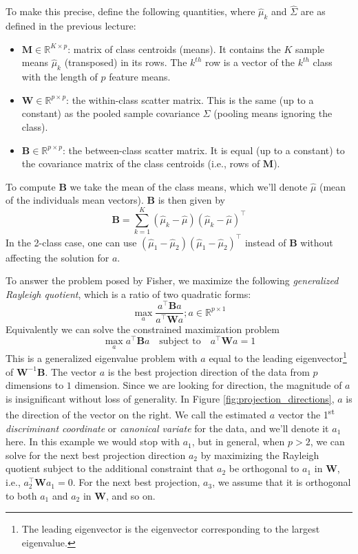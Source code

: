 \documentclass[a4paper]{article}
\begin{document}
To make this precise, define the following quantities, where ${\hat \mu}_k$ and ${\hat \Sigma}$ are as defined in the previous lecture:
\begin{itemize}
\item ${\mathbf M}\in {\mathbb R}^{K\times p}$: matrix of class centroids (means).  It contains the $K$ sample means $\hat{\mu}_{k}$ (transposed) in its rows. The $k^{th}$ row is a vector of the $k^{th}$ class with the length of $p$ feature means. 
\item ${\mathbf W}\in {\mathbb R}^{p\times p}$: the within-class scatter matrix.  This is the same (up to a constant) as the pooled sample covariance $\hat{\Sigma}$ (pooling means ignoring the class).
\item ${\mathbf B}\in {\mathbb R}^{p\times p}$: the between-class scatter matrix.  It is equal (up to a constant) to the covariance matrix of the class centroids (i.e., rows of $\mathbf M$).
\end{itemize}
To compute $\mathbf B$ we take the mean of the class means, which we'll denote $\hat{\mu}$ (mean of the individuals mean vectors).  $\mathbf B$ is then given by
$$
{\mathbf B} = \sum_{k=1}^K (\hat{\mu}_k-\hat{\mu})(\hat{\mu}_k-\hat{\mu})^\top
$$
In the 2-class case, one can use $(\hat{\mu}_{1}-\hat{\mu}_{2})(\hat{\mu}_{1}-\hat{\mu}_{2})^\top$ instead of $\mathbf B$ without affecting the solution for $a$.

To answer the problem posed by Fisher, we maximize the following \emph{generalized Rayleigh quotient}, which is a ratio of two quadratic forms:
$$
\max_a \frac{a^\top {\mathbf B} a}{a^\top {\mathbf W} a}; a\in {\mathbb R}^{p\times 1}
$$
Equivalently we can solve the constrained maximization problem
$$
\max_a a^\top {\mathbf B} a \quad \text{subject to} \quad a^\top {\mathbf W} a=1
$$
This is a generalized eigenvalue problem with $a$ equal to the leading eigenvector\footnote{The leading eigenvector is the eigenvector corresponding to the largest eigenvalue.} of ${\mathbf W}^{-1}{\mathbf B}$. The vector $a$ is the best projection direction of the data from $p$ dimensions to $1$ dimension. Since we are looking for direction, the magnitude of $a$ is insignificant without loss of generality. In Figure \ref{fig:projection_directions}, $a$ is the direction of the vector on the right. We call the estimated $a$ vector the 1\textsuperscript{st} \emph{discriminant coordinate} or \emph{canonical variate} for the data, and we'll denote it $a_1$ here.  In this example we would stop with $a_1$, but in general, when $p>2$, we can solve for the next best projection direction $a_2$ by maximizing the Rayleigh quotient subject to the additional constraint that $a_2$ be orthogonal to $a_1$ in ${\mathbf W}$, i.e., $a_2^\top {\mathbf W} a_1=0$. For the next best projection, $a_3$, we assume that it is orthogonal to both $a_1$ and $a_2$ in $\mathbf W$, and so on.
\end{document}
